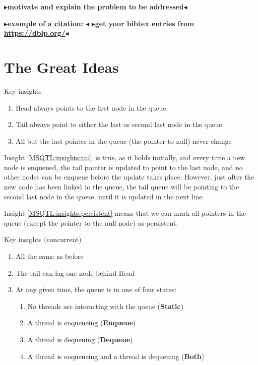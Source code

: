 \documentclass[twoside,11pt,openright]{report}
\newcommand{\todo}[1]{{\color[rgb]{.5,0,0}\textbf{$\blacktriangleright$#1$\blacktriangleleft$}}}
\begin{document}
\todo{motivate and explain the problem to be addressed}

\todo{example of a citation: \cite{DBLP:conf/podc/MichaelS96}}
\todo{get your bibtex entries from \url{https://dblp.org/}}


\chapter{The Great Ideas}
\label{ch:main}

Key insights
\begin{enumerate}
  \item\label{MSQTL:insights:head} Head always points to the first node in the queue.
  \item\label{MSQTL:insights:tail} Tail always point to either the last or second last node in the queue.
  \item\label{MSQTL:insights:persistent} All but the last pointer in the queue (the pointer to null) never change
\end{enumerate}

Insight \ref{MSQTL:insights:tail} is true, as it holds initially, and every time a new node is enqueued, the tail pointer is updated to point to the last node, and no other nodes can be enqueue before the update takes place. However, just after the new node has been linked to the queue, the tail queue will be pointing to the second last node in the queue, until it is updated in the next line.

Insight \ref{MSQTL:insights:persistent} means that we can mark all pointers in the queue (except the pointer to the null node) as persistent.

Key insights (concurrent)
\begin{enumerate}
  \item All the same as before
  \item\label{MSQTL:insights:lag} The tail can lag one node behind Head
  \item\label{MSQTL:insights:states} At any given time, the queue is in one of four states:
    \begin{enumerate}
      \item\label{MSQTL:insights:state:static} No threads are interacting with the queue (\textbf{Static})
      \item\label{MSQTL:insights:state:enqueue} A thread is enqueueing (\textbf{Enqueue})
      \item\label{MSQTL:insights:state:dequeue} A thread is dequeuing (\textbf{Dequeue})
      \item\label{MSQTL:insights:state:both} A thread is enqueueing and a thread is dequeuing (\textbf{Both})
    \end{enumerate}
\end{enumerate}
\end{document}
